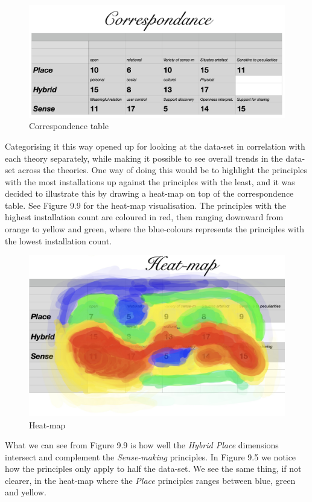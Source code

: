 \begin{figure}[H]
\includegraphics[width=13cm]{pictures/analysis/correspondence.png}
\caption{Correspondence table}
\centering 
\end{figure}

Categorising it this way opened up for looking at the data-set in correlation with each theory separately, while making it possible to see overall trends in the data-set across the theories. One way of doing this would be to highlight the principles with the most installations up against the principles with the least, and it was decided to illustrate this by drawing a heat-map on top of the correspondence table. See Figure 9.9 for the heat-map visualisation. The principles with the highest installation count are coloured in red, then ranging downward from orange to yellow and green, where the blue-colours represents the principles with the lowest installation count.

\begin{figure}[H]
\includegraphics[width=13cm]{pictures/analysis/heatmap.jpeg}
\caption{Heat-map}
\centering 
\end{figure}

What we can see from Figure 9.9 is how well the \textit{Hybrid Place} dimensions intersect and complement the \textit{Sense-making} principles. In Figure 9.5 we notice how the principles only apply to half the data-set. We see the same thing, if not clearer, in the heat-map where the \textit{Place} principles ranges between blue, green and yellow.


